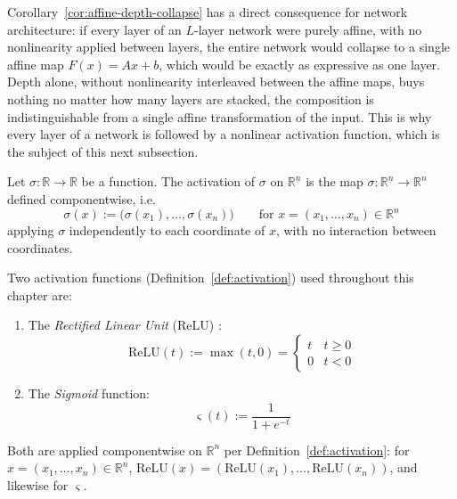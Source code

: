		\begin{remark}
			\label{rem:why-nonlinearity}
			Corollary~\ref{cor:affine-depth-collapse} has a direct consequence for network architecture: if every layer of an $L$-layer network were purely affine, with no nonlinearity applied between layers, the entire network would collapse to a single affine map $F(x)=Ax+b$, which would be exactly as expressive as one layer. \\
			
			Depth alone, without nonlinearity interleaved between the affine maps, buys nothing no matter how many layers are stacked, the composition is indistinguishable from a single affine transformation of the input. This is why every layer of a network is followed by a nonlinear activation function, which is the subject of this next subsection.
		\end{remark}
		
		\begin{definition}
			\label{def:activation}
			Let $\sigma:\mathbb{R}\to\mathbb{R}$ be a function. The activation of $\sigma$ on $\mathbb{R}^n$ is the map $\sigma:\mathbb{R}^n\to\mathbb{R}^n$ defined componentwise, i.e.\
			\[
				\sigma(x) := \big(\sigma(x_1),\dots,\sigma(x_n)\big) \qquad \text{for } x=(x_1,\dots,x_n)\in\mathbb{R}^n
			\]
			applying $\sigma$ independently to each coordinate of $x$, with no interaction between coordinates.
		\end{definition}
		
		\begin{example}
			\label{ex:relu-sigmoid}
			Two activation functions (Definition~\ref{def:activation}) used throughout this chapter are:
			\begin{enumerate}[label=\roman*.]
				\item \label{ex:relu} The \emph{Rectified Linear Unit} (ReLU) \citep{NairHinton2010}:
				\[
					\mathrm{ReLU}(t) := \max(t,0) = \begin{cases} t & t\ge0 \\ 0 & t<0 \end{cases}
				\]
				\item \label{ex:sigmoid} The \emph{Sigmoid} function:
				\[
					\varsigma(t)  := \frac{1}{1+e^{-t}}
				\]
			\end{enumerate}
			Both are applied componentwise on $\mathbb{R}^n$ per Definition~\ref{def:activation}: for $x=(x_1,\dots,x_n)\in\mathbb{R}^n$, $\mathrm{ReLU}(x) = (\mathrm{ReLU}(x_1),\dots,\mathrm{ReLU}(x_n))$, and likewise for $\varsigma$.
		\end{example}
		
